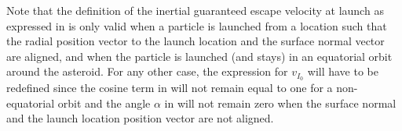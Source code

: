 %
\newline\newline
%
Note that the definition of the inertial guaranteed escape velocity at launch as expressed in  is only valid when a particle is launched from a location such that the radial position vector to the launch location and the surface normal vector are aligned, and when the particle is launched (and stays) in an equatorial orbit around the asteroid. For any other case, the expression for $v_{I_0}$ will have to be redefined since the cosine term in  will not remain equal to one for a non-equatorial orbit and the angle $\alpha$ in  will not remain zero when the surface normal and the launch location position vector are not aligned.


